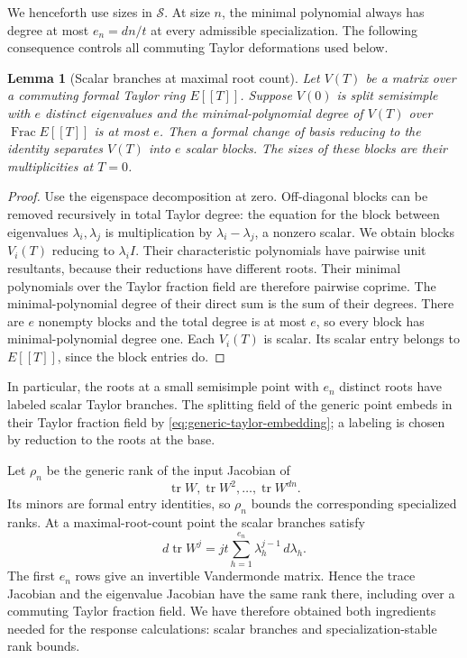 \documentclass[11pt]{article}
\newtheorem{lemma}[theorem]{Lemma}
\theoremstyle{definition}
\theoremstyle{remark}
\numberwithin{equation}{section}
\begin{document}
We henceforth use sizes in $\mathcal S$.  At size $n$, the minimal
polynomial always has degree at most $e_n=dn/t$ at every admissible
specialization.  The following consequence controls all commuting
Taylor deformations used below.

\begin{lemma}[Scalar branches at maximal root count]
\label{lem:scalar-branches}
Let $V(T)$ be a matrix over a commuting formal Taylor ring $E[[T]]$.
Suppose $V(0)$ is split semisimple with $e$ distinct eigenvalues and
the minimal-polynomial degree of $V(T)$ over
$\operatorname{Frac}E[[T]]$ is at most $e$.  Then a formal change of
basis reducing to the identity separates $V(T)$ into $e$ scalar
blocks.  The sizes of these blocks are their multiplicities at
$T=0$.
\end{lemma}

\begin{proof}
Use the eigenspace decomposition at zero.  Off-diagonal blocks can be
removed recursively in total Taylor degree: the equation for the
block between eigenvalues $\lambda_i,\lambda_j$ is multiplication
by $\lambda_i-\lambda_j$, a nonzero scalar.  We obtain blocks
$V_i(T)$ reducing to $\lambda_i I$.  Their characteristic polynomials
have pairwise unit resultants, because their reductions have different
roots.  Their minimal polynomials over the Taylor fraction field are
therefore pairwise coprime.  The minimal-polynomial degree of their
direct sum is the sum of their degrees.  There are $e$ nonempty
blocks and the total degree is at most $e$, so every block has
minimal-polynomial degree one.  Each $V_i(T)$ is scalar.  Its scalar
entry belongs to $E[[T]]$, since the block entries do.
\end{proof}

In particular, the roots at a small semisimple point with $e_n$
distinct roots have labeled scalar Taylor branches.  The splitting
field of the generic point embeds in their Taylor fraction field by
\eqref{eq:generic-taylor-embedding}; a labeling is chosen by reduction
to the roots at the base.

Let $\rho_n$ be the generic rank of the input Jacobian of
\[
 \operatorname{tr}W,\operatorname{tr}W^2,\ldots,
 \operatorname{tr}W^{dn}.
\]
Its minors are formal entry identities, so $\rho_n$ bounds the
corresponding specialized ranks.  At a maximal-root-count point the
scalar branches satisfy
\[
 d\operatorname{tr}W^j
   =jt\sum_{h=1}^{e_n}\lambda_h^{j-1}\,d\lambda_h.
\]
The first $e_n$ rows give an invertible Vandermonde matrix.  Hence
the trace Jacobian and the eigenvalue Jacobian have the same rank
there, including over a commuting Taylor fraction field.  We have
therefore obtained both ingredients needed for the response
calculations: scalar branches and specialization-stable rank bounds.
\end{document}
